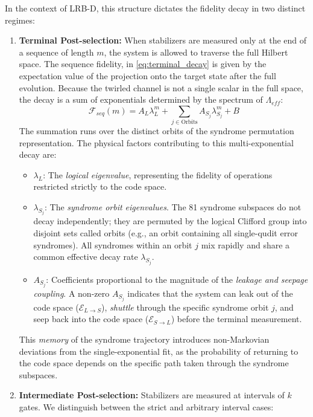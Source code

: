 In the context of LRB-D, this structure dictates the fidelity decay in two distinct regimes:

\begin{enumerate}
    \item \textbf{Terminal Post-selection:} When stabilizers are measured only at the end of a sequence of length $m$, the system is allowed to traverse the full Hilbert space. The sequence fidelity, in \autoref{eq:terminal_decay} is given by the expectation value of the projection onto the target state after the full evolution. Because the twirled channel is not a single scalar in the full space, the decay is a sum of exponentials determined by the spectrum of $\Lambda_{eff}$:
    \begin{equation}
        \mathcal{F}_{seq}(m) = A_L \lambda_L^m + \sum_{j \in \text{Orbits}} A_{S_j} \lambda_{S_j}^m + B
        \label{eq:terminal_decay}
    \end{equation}
    The summation runs over the distinct orbits of the syndrome permutation representation. The physical factors contributing to this multi-exponential decay are:
    \begin{itemize}
        \item $\lambda_L$: The \textit{logical eigenvalue}, representing the fidelity of operations restricted strictly to the code space.
        \item $\lambda_{S_j}$: The \textit{syndrome orbit eigenvalues}. The 81 syndrome subspaces do not decay independently; they are permuted by the logical Clifford group into disjoint sets called orbits (e.g., an orbit containing all single-qudit error syndromes). All syndromes within an orbit $j$ mix rapidly and share a common effective decay rate $\lambda_{S_j}$.
        \item $A_{S_j}$: Coefficients proportional to the magnitude of the \textit{leakage and seepage coupling}. A non-zero $A_{S_j}$ indicates that the system can leak out of the code space ($\mathcal{E}_{L \to S}$), \emph{shuttle} through the specific syndrome orbit $j$, and seep back into the code space ($\mathcal{E}_{S \to L}$) before the terminal measurement.
    \end{itemize}
    This \emph{memory} of the syndrome trajectory introduces non-Markovian deviations from the single-exponential fit, as the probability of returning to the code space depends on the specific path taken through the syndrome subspaces.

    \item \textbf{Intermediate Post-selection:} Stabilizers are measured at intervals of $k$ gates. We distinguish between the strict and arbitrary interval cases:
    

\end{enumerate}
